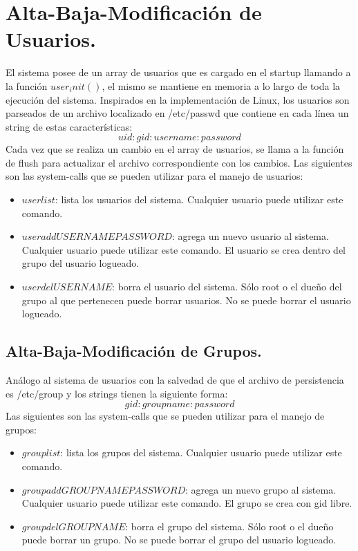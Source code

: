 \documentclass[english]{article}
\begin{document}
\section{Alta-Baja-Modificación de Usuarios.}
El sistema posee de un array de usuarios que es cargado en el startup llamando a la función $user_init()$, el mismo se mantiene en memoria a lo largo de toda la ejecución del sistema. Inspirados en la implementación de Linux, los usuarios son parseados de un archivo localizado en /etc/passwd que contiene en cada línea un string de estas características:
$$uid:gid:username:password$$
Cada vez que se realiza un cambio en el array de usuarios, se llama a la función de flush para actualizar el archivo correspondiente con los cambios.
Las siguientes son las system-calls que se pueden utilizar para el manejo de usuarios:
\begin{itemize}

\item $userlist$: lista los usuarios del sistema.
\subitem Cualquier usuario puede utilizar este comando.

\item $useradd USERNAME PASSWORD$: agrega un nuevo usuario al sistema.
\subitem Cualquier usuario puede utilizar este comando.
\subitem El usuario se crea dentro del grupo del usuario logueado.

\item $userdel USERNAME$: borra el usuario del sistema.
\subitem Sólo root o el dueño del grupo al que pertenecen puede borrar usuarios.
\subitem No se puede borrar el usuario logueado.

\end{itemize}
 
\subsection{Alta-Baja-Modificación de Grupos.}
Análogo al sistema de usuarios con la salvedad de que el archivo de persistencia es /etc/group y los strings tienen la siguiente forma:
$$gid:groupname:password$$
Las siguientes son las system-calls que se pueden utilizar para el manejo de grupos:
\begin{itemize}

\item $grouplist$: lista los grupos del sistema.
\subitem Cualquier usuario puede utilizar este comando.

\item $groupadd GROUPNAME PASSWORD$: agrega un nuevo grupo al sistema.
\subitem Cualquier usuario puede utilizar este comando.
\subitem El grupo se crea con gid libre.

\item $groupdel GROUPNAME$: borra el grupo del sistema.
\subitem Sólo root o el dueño puede borrar un grupo.
\subitem No se puede borrar el grupo del usuario logueado.

\end{itemize}
\end{document}
